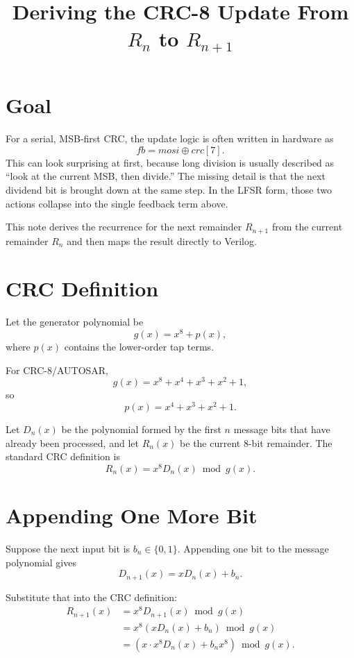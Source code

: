 \documentclass[11pt]{article}
\title{Deriving the CRC-8 Update From $R_n$ to $R_{n+1}$}
\author{}
\date{}
\begin{document}
\maketitle

\section{Goal}

For a serial, MSB-first CRC, the update logic is often written in hardware as
\[
\mathit{fb} = \mathit{mosi} \oplus \mathit{crc}[7].
\]
This can look surprising at first, because long division is usually described as
``look at the current MSB, then divide.'' The missing detail is that the next
dividend bit is brought down at the same step. In the LFSR form, those two actions
collapse into the single feedback term above.

This note derives the recurrence for the next remainder $R_{n+1}$ from the current
remainder $R_n$ and then maps the result directly to Verilog.

\section{CRC Definition}

Let the generator polynomial be
\[
g(x) = x^8 + p(x),
\]
where $p(x)$ contains the lower-order tap terms.

For CRC-8/AUTOSAR,
\[
g(x) = x^8 + x^4 + x^3 + x^2 + 1,
\]
so
\[
p(x) = x^4 + x^3 + x^2 + 1.
\]

Let $D_n(x)$ be the polynomial formed by the first $n$ message bits that have
already been processed, and let $R_n(x)$ be the current 8-bit remainder. The
standard CRC definition is
\[
R_n(x) = x^8 D_n(x) \bmod g(x).
\]

\section{Appending One More Bit}

Suppose the next input bit is $b_n \in \{0,1\}$. Appending one bit to the message
polynomial gives
\[
D_{n+1}(x) = xD_n(x) + b_n.
\]

Substitute that into the CRC definition:
\begin{align*}
R_{n+1}(x)
&= x^8 D_{n+1}(x) \bmod g(x) \\
&= x^8 (xD_n(x) + b_n) \bmod g(x) \\
&= (x \cdot x^8 D_n(x) + b_n x^8) \bmod g(x).
\end{align*}
\end{document}
